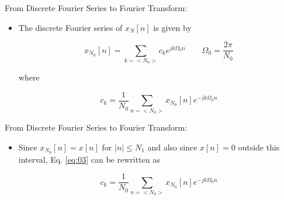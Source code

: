\documentclass[pdflatex,compress,mathserif]{beamer}
\begin{document}
\begin{frame}{From Discrete Fourier Series to Fourier Transform:}
	\begin{itemize}
		\item The discrete Fourier series of $ x_N[n] $ is given by
		
		\begin{equation}\label{eq:02}
			x_{N_0}[n] = \sum\limits_{k=<N_0>} c_k e^{j k \Omega_0 n}\qquad \Omega_0 = \frac{2 \pi}{N_0}
		\end{equation}
		
		where
		
		\begin{equation}\label{eq:03}
			c_k = \frac{1}{N_0}\sum\limits_{n=<N_0>} x_{N_0}[n]e^{-j k \Omega_0 n}
		\end{equation}
		
	\end{itemize}
\end{frame}

\begin{frame}{From Discrete Fourier Series to Fourier Transform:}
	\begin{itemize}
		\item Since $ x_{N_0}[n] = x[n] $ for $ |n| \leq N_1 $ and also since $ x[n] = 0 $ outside this interval, Eq. \ref{eq:03} can be rewritten as
		
		\begin{equation}\label{eq:03}
			c_k = \frac{1}{N_0}\sum\limits_{n=<N_0>} x_{N_0}[n]e^{-j k \Omega_0 n}
		\end{equation}
	
	\end{itemize}
\end{frame}
\end{document}
